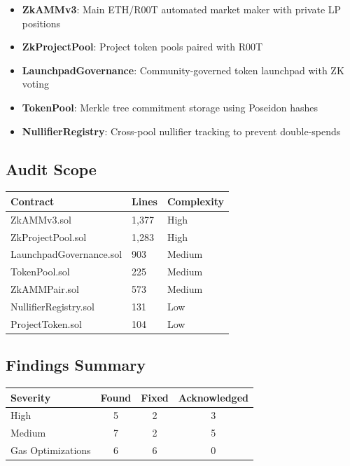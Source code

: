\documentclass[11pt,a4paper]{article}
\begin{document}
\begin{itemize}
    \item \textbf{ZkAMMv3}: Main ETH/R00T automated market maker with private LP positions
    \item \textbf{ZkProjectPool}: Project token pools paired with R00T
    \item \textbf{LaunchpadGovernance}: Community-governed token launchpad with ZK voting
    \item \textbf{TokenPool}: Merkle tree commitment storage using Poseidon hashes
    \item \textbf{NullifierRegistry}: Cross-pool nullifier tracking to prevent double-spends
\end{itemize}

\subsection{Audit Scope}

\begin{longtable}{lll}
\toprule
\textbf{Contract} & \textbf{Lines} & \textbf{Complexity} \\
\midrule
ZkAMMv3.sol & 1,377 & High \\
ZkProjectPool.sol & 1,283 & High \\
LaunchpadGovernance.sol & 903 & Medium \\
TokenPool.sol & 225 & Medium \\
ZkAMMPair.sol & 573 & Medium \\
NullifierRegistry.sol & 131 & Low \\
ProjectToken.sol & 104 & Low \\
\bottomrule
\end{longtable}

\subsection{Findings Summary}

\begin{center}
\begin{tabular}{|l|c|c|c|}
\hline
\textbf{Severity} & \textbf{Found} & \textbf{Fixed} & \textbf{Acknowledged} \\
\hline
\cellcolor{high!20}High & 5 & 2 & 3 \\
\cellcolor{medium!20}Medium & 7 & 2 & 5 \\
\cellcolor{info!20}Gas Optimizations & 6 & 6 & 0 \\
\hline
\end{tabular}
\end{center}
\end{document}
